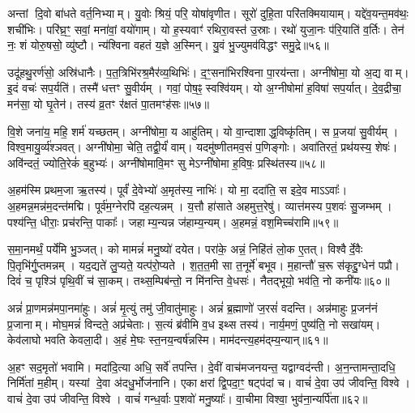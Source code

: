 अन्तां दि॒वो बा॑धते वर्त॒निभ्याम्।
यु॒वोः श्रियं॒ परि॒ योषा॑वृणीत।
सूरो॑ दुहि॒ता परि॑तक्मियायाम्।
यद्दे॑व॒यन्त॒मव॑थः॒ शची॑भिः।
परि॑घ्र॒ꣳ॒ सवां॒ मना॑वां॒ वयो॑गाम्।
यो ह॒स्यवाꣳ॑ रथिरा॒वस्त॑ उ॒स्राः।
रथो॑ युजा॒नः प॑रि॒याति॑ व॒र्तिः।
तेन॑ नः॒ शं योरु॒षसो॒ व्यु॑ष्टौ।
न्य॑श्विना वहतं य॒ज्ञे अ॒स्मिन्।
यु॒वं भु॒ज्युमव॑विद्धꣳ समु॒द्रे॥५६॥

उदू॑हथु॒रर्ण॑सो॒ अस्रि॑धानैः।
प॒त॒त्रिभि॑रश्र॒मैर॑व्य॒थिभिः॑।
द॒ꣳ॒सना॑भिरश्विना पा॒रय॑न्ता।
अग्नी॑षोमा॒ यो अ॒द्य वाम्।
इ॒दं वचः॑ सप॒र्यति॑।
तस्मै॑ धत्तꣳ सु॒वीर्यम्।
गवां॒ पोष॒ꣴ॒ स्वश्वि॑यम्।
यो अ॒ग्नीषोमा॑ ह॒विषा॑ सप॒र्यात्।
दे॒व॒द्रीचा॒ मन॑सा॒ यो घृ॒तेन॑।
तस्य॑ व्र॒तꣳ र॑क्षतं पा॒तमꣳह॑सः॥५७॥

वि॒शे जना॑य॒ महि॒ शर्म॑ यच्छतम्।
अग्नी॑षोमा॒ य आहु॑तिम्।
यो वा॒न्दाशाद्ध॒विष्कृ॑तिम्।
स प्र॒जया॑ सु॒वीर्यम्।
विश्व॒मायु॒र्व्य॑श्ञवत्।
अग्नी॑षोमा॒ चेति॒ तद्वी॒र्यं॑ वाम्।
यदमु॑ष्णीतमव॒सं प॒णिङ्गोः।
अवा॑तिरतं॒ प्रथ॑यस्य॒ शेषः॑।
अवि॑न्दतं॒ ज्योति॒रेकं॑ ब॒हुभ्यः॑।
अग्नी॑षोमावि॒मꣳ सु मेऽग्नी॑षोमा ह॒विषः॒ प्रस्थि॑तस्य॥५८॥\anuvakamend[ज॒भा॒र॒ द्यौर॒ग्नेरु॒पस्थ॑ उप॒क्ष्यन्तो॑ बद्बधा॒नो व॒ध्वा॑ याद॑मानः समु॒द्रे\-ऽꣳह॑सः॒ प्रस्थि॑तस्य]

अ॒हम॑स्मि प्रथम॒जा ऋ॒तस्य॑।
पूर्वं॑ दे॒वेभ्यो॑ अ॒मृत॑स्य॒ नाभिः॑।
यो मा॒ ददा॑ति॒ स इदे॒व माऽऽवाः᳚।
अ॒हमन्न॒मन्न॑म॒दन्त॑मद्मि।
पूर्व॑म॒ग्नेरपि॑ दह॒त्यन्नम्।
य॒त्तौ हा॑साते अहमुत्त॒रेषु॑।
व्यात्त॑मस्य प॒शवः॑ सु॒जम्भम्।
पश्य॑न्ति॒ धीराः॒ प्रच॑रन्ति॒ पाकाः᳚।
जहाम्य॒न्यन्न ज॑हाम्य॒न्यम्।
अ॒हमन्नं॒ वश॒मिच्च॑रामि॥५९॥

स॒मा॒नमर्थं॒ पर्ये॑मि भु॒ञ्जत्।
को मामन्नं॑ मनु॒ष्यो॑ दयेत।
परा॑के॒ अन्नं॒ निहि॑तं लो॒क ए॒तत्।
विश्वैर्दे॒वैः पि॒तृभि॑र्गु॒प्तमन्नम्।
यद॒द्यते॑ लु॒प्यते॒ यत्प॑रो॒प्यते।
श॒त॒त॒मी सा त॒नूर्मे॑ बभूव।
म॒हान्तौ॑ च॒रू स॑कृद्दु॒ग्धेन॑ पप्रौ।
दिवं॑ च॒ पृश्ञि॑ पृथि॒वीं च॑ सा॒कम्।
तथ्स॒म्पिब॑न्तो॒ न मि॑नन्ति वे॒धसः॑।
नैतद्भूयो॒ भव॑ति॒ नो कनी॑यः॥६०॥

अन्नं॑ प्रा॒णमन्न॑मपा॒नमा॑हुः।
अन्नं॑ मृ॒त्युं तमु॑ जी॒वातु॑माहुः।
अन्नं॑ ब्र॒ह्माणो॑ ज॒रसं॑  वदन्ति।
अन्न॑माहुः प्र॒जन॑नं प्र॒जानाम्।
मोघ॒मन्नं॑ विन्दते॒ अप्र॑चेताः।
स॒त्यं ब्र॑वीमि व॒ध इथ्स तस्य॑।
नार्य॒मणं॒ पुष्य॑ति॒ नो सखा॑यम्।
केव॑लाघो भवति केवला॒दी।
अ॒हं मे॒घः स्त॒नय॒न्वर्\mbox{}ष॑न्नस्मि।
माम॑दन्त्य॒हम॑द्म्य॒न्यान्॥६१॥

अ॒हꣳ सद॒मृतो॑ भवामि।
मदा॑दि॒त्या अधि॒ सर्वे॑ तपन्ति।
दे॒वीं वाच॑मजनयन्त॒ यद्वाग्वद॑न्ती।
अ॒न॒न्तामन्ता॒दधि॒ निर्मि॑तां म॒हीम्।
यस्यां दे॒वा अ॑दधु॒र्भोज॑नानि।
एकाक्षरां द्वि॒पदा॒ꣳ॒ षट्प॑दां च।
वाचं॑ दे॒वा उप॑ जीवन्ति॒ विश्वे।
वाचं॑ दे॒वा उप॑ जीवन्ति॒ विश्वे।
वाचं॑ गन्ध॒र्वाः प॒शवो॑ मनु॒ष्याः᳚।
वा॒चीमा विश्वा॒ भुव॑ना॒न्यर्पि॑ता॥६२॥

